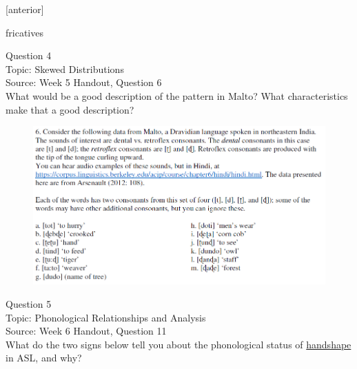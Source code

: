 \documentclass[12pt]{article}
\begin{document}
{[anterior]}

fricatives


\newpage

{\large Question 4}\\

Topic: Skewed Distributions\\
Source: Week 5 Handout, Question 6\\

What would be a good description of the pattern in Malto? What characteristics make that a good description?\\

\begin{figure}[H]
\includegraphics{../images/malto.png}
\end{figure}

\newpage

{\large Question 5}\\

Topic: Phonological Relationships and Analysis\\
Source: Week 6 Handout, Question 11\\

What do the two signs below tell you about the phonological status of \underline{handshape} in ASL, and why?\\
\end{document}
